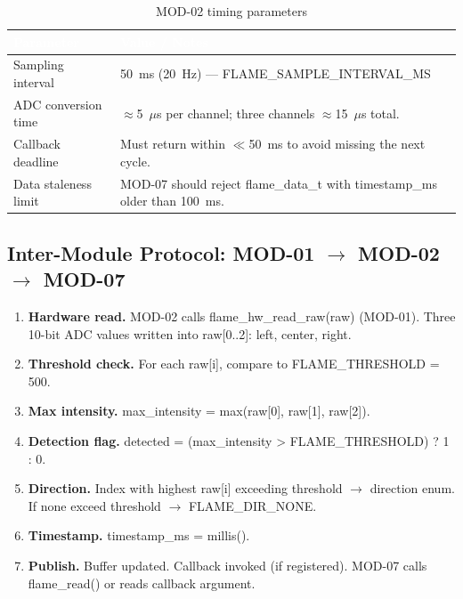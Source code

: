 \documentclass[12pt,a4paper]{article}
\newcommand{\theadtext}[1]{\textcolor{white}{\textbf{#1}}}
\newcommand{\fn}[1]{{\footnotesize\ttfamily #1}}
\begin{document}
\begin{table}[H]\centering\small
\begin{tabularx}{\textwidth}{L{5cm} X}
\toprule
{}\theadtext{Parameter} & \theadtext{Value / Notes} \\
\midrule
{}   Sampling interval    & 50~ms (20~Hz) --- \fn{FLAME\_SAMPLE\_INTERVAL\_MS} \\
 ADC conversion time  & $\approx$5~$\mu$s per channel; three channels $\approx$15~$\mu$s total. \\
   Callback deadline    & Must return within $\ll$50~ms to avoid missing the next cycle. \\
 Data staleness limit & MOD-07 should reject \fn{flame\_data\_t} with \fn{timestamp\_ms} older than 100~ms. \\
\bottomrule
\end{tabularx}
\caption{MOD-02 timing parameters}
\end{table}

\subsection{Inter-Module Protocol: MOD-01 $\rightarrow$ MOD-02 $\rightarrow$ MOD-07}

\begin{enumerate}[leftmargin=*, label=\textbf{Step \arabic*.}]
  \item \textbf{Hardware read.} MOD-02 calls \fn{flame\_hw\_read\_raw(raw)} (MOD-01). Three 10-bit ADC values written into \fn{raw[0..2]}: left, center, right.
  \item \textbf{Threshold check.} For each \fn{raw[i]}, compare to \fn{FLAME\_THRESHOLD = 500}.
  \item \textbf{Max intensity.} \fn{max\_intensity = max(raw[0], raw[1], raw[2])}.
  \item \textbf{Detection flag.} \fn{detected = (max\_intensity > FLAME\_THRESHOLD) ? 1 : 0}.
  \item \textbf{Direction.} Index with highest \fn{raw[i]} exceeding threshold $\rightarrow$ direction enum. If none exceed threshold $\rightarrow$ \fn{FLAME\_DIR\_NONE}.
  \item \textbf{Timestamp.} \fn{timestamp\_ms = millis()}.
  \item \textbf{Publish.} Buffer updated. Callback invoked (if registered). MOD-07 calls \fn{flame\_read()} or reads callback argument.
\end{enumerate}
\end{document}
